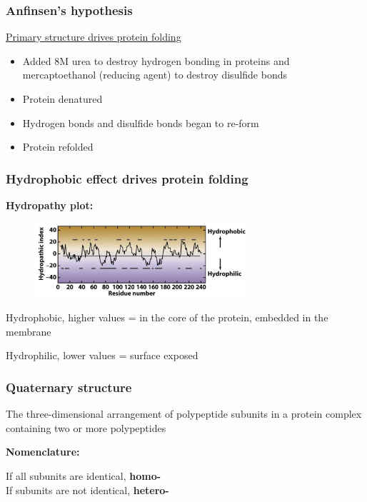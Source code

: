 \documentclass[letterpaper, 12pt]{article}
\begin{document}
\subsubsection*{Anfinsen's hypothesis}
\underline{Primary structure drives protein folding}

\begin{itemize}
\item Added 8M urea to destroy hydrogen bonding in proteins and mercaptoethanol (reducing agent) to destroy disulfide bonds
\item Protein denatured
\item Hydrogen bonds and disulfide bonds began to re-form
\item Protein refolded
\end{itemize}

\subsubsection*{Hydrophobic effect drives protein folding}

\textbf{Hydropathy plot:}

\begin{figure}[H]
\centering
\includegraphics[width=0.7\textwidth]{hydropathy}
\end{figure}

Hydrophobic, higher values = in the core of the protein, embedded in the membrane

Hydrophilic, lower values = surface exposed

\subsubsection*{Quaternary structure}

The three-dimensional arrangement of polypeptide subunits in a protein complex containing two or more polypeptides

\textbf{Nomenclature:}

If all subunits are identical, \textbf{homo-} \\
If subunits are not identical, \textbf{hetero-} \\
\end{document}
